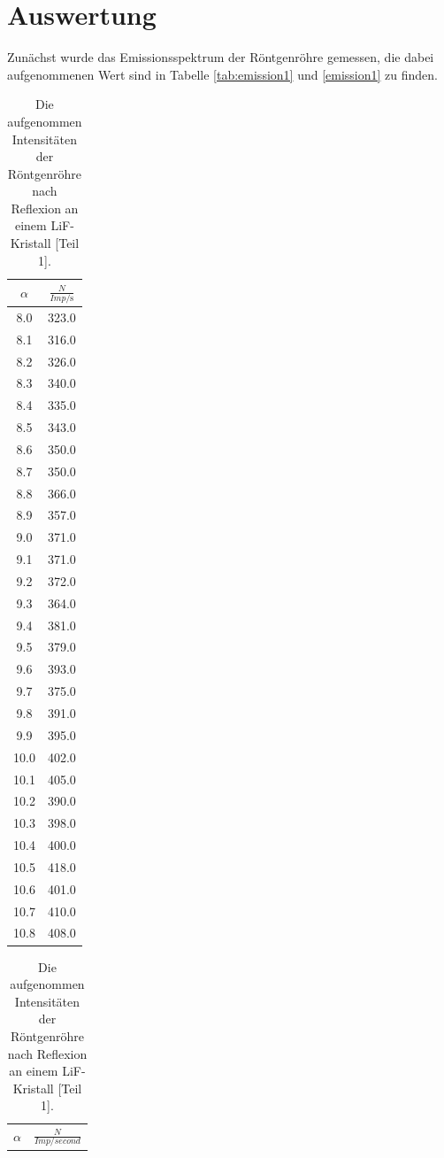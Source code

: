 \section{Auswertung}
\label{sec:Auswertung}

Zunächst wurde das Emissionsspektrum der Röntgenröhre gemessen, die dabei aufgenommenen Wert sind in Tabelle \ref{tab:emission1} und \ref{emission1} zu finden.
\FloatBarrier
\begin{table}
\centering
  \caption{Die aufgenommen Intensitäten der Röntgenröhre nach Reflexion an einem LiF-Kristall [Teil 1].}
  \begin{tabular}[t]{cc}
  \toprule
  $\alpha$ & $\frac{N}{Imp/\si{\second}}$\\
  \midrule
  8.0 & 323.0 \\
  8.1 & 316.0\\
  8.2 & 326.0\\
  8.3 & 340.0\\
  8.4 & 335.0\\
  8.5 & 343.0\\
  8.6 & 350.0\\
  8.7 & 350.0\\
  8.8 & 366.0\\
  8.9 & 357.0\\
  9.0 & 371.0\\
  9.1 & 371.0\\
  9.2 & 372.0\\
  9.3 & 364.0\\
  9.4 & 381.0\\
  9.5 & 379.0\\
  9.6 & 393.0\\
  9.7 & 375.0\\
  9.8 & 391.0\\
  9.9 & 395.0\\
  10.0 & 402.0\\
  10.1 & 405.0\\
  10.2 & 390.0\\
  10.3 & 398.0\\
  10.4 & 400.0\\
  10.5 & 418.0\\
  10.6 & 401.0\\
  10.7 & 410.0\\
  10.8 & 408.0\\
  \bottomrule
  \end{tabular}
  \begin{tabular}[t]{cc}
  \toprule
  $\alpha$ & $\frac{N}{Imp/\si{second}}$ \\

\end{tabular}
\end{table}
